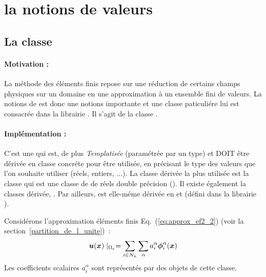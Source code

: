 
\section{la notions de valeurs}

\subsection{La classe }

\paragraph*{Motivation :}
La m\'ethode des \'el\'ements finis repose sur une r\'eduction de certains
champs physiques sur un domaine en une approximation \`a un ensemble
fini de valeurs. La notions de  est donc une notions
importante et une classe paticuli\'ere lui est consacr\'ee dans la
librairie . Il s'agit de la classe .

\paragraph*{Impl\'ementation :}
C'est une
  qui est, de plus
  \textit{Templatis\'ee} (param\'etr\'ee par un type) et DOIT \^etre d\'eriv\'ee en classe concr\'ete pour \^etre utilis\'ee, en pr\'ecisant le type des valeurs que l'on souhaite utiliser (r\'eels, entiers, ...).
La classe d\'eriv\'ee la plus utilis\'ee est la classe
  qui est une classe de  de r\'eels
double pr\'ecision (). Il existe \'egalement la
classes d\'eriv\'ee,  . Par ailleurs, 
est elle-m\'eme d\'eriv\'ee en  et
 (d\'efini dans la librairie ).



Consid\'erons l'approximation \'el\'ements finis
Eq.~(\ref{eq:approx_ef2_2}) (voir la
section~\ref{partition_de_l_unite})~:
\begin{equation}
  \label{eq:approx_ef2_2}
  \mbox{\boldmath $u$}(\mbox{\boldmath $x$}) \mid_{{\Omega}_e} = \sum_{i \in N_n} \sum_{\alpha} a_i^\alpha
  \mbox{\boldmath $\phi$}_i^\alpha(\mbox{\boldmath $x$})
\end{equation}
Les coefficients scalaires $a_i^\alpha$ sont
repr\'esent\'es par des objets de cette classe.





